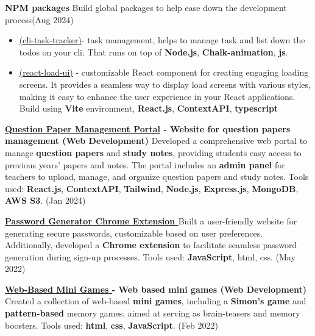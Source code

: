 \documentclass[a4paper,20pt]{article}
\newcommand{\resumeItem}[2]{
  \item\small{
    \textbf{#1}{ #2 \vspace{-2pt}}
  }
}
\newcommand{\resumeSubItem}[2]{\resumeItem{#1}{#2}\vspace{-3pt}}
\newcommand{\resumeItemListStart}{\begin{itemize}}
\newcommand{\resumeItemListEnd}{\end{itemize}\vspace{-5pt}}
\begin{document}
\resumeItem{NPM packages}{Build global packages to help ease down the development process(Aug 2024)}
	\resumeItemListStart
        \resumeItem{}{\href{https://www.npmjs.com/package/cli-task-tracker}{(cli-task-tracker)}- task management, helps to manage task and list down the todos on your cli. That runs on top of \textbf{Node.js}, \textbf{Chalk-animation}, \textbf{js}. }
        \resumeItem{}{\href{https://www.npmjs.com/package/react-loadscreen-ui}{(react-load-ui)} - customizable React component for creating engaging loading screens. It provides a seamless way to display load screens with various styles, making it easy to enhance the user experience in your React applications. Build using \textbf{Vite} environment, \textbf{React.js}, \textbf{ContextAPI}, \textbf{typescript}}
	\resumeItemListEnd
\vspace{5pt}
\resumeSubItem{\href{https://github.com/DaaSH23/QPportal}{Question Paper Management Portal} - Website for question papers management (Web Development)}{Developed a comprehensive web portal to manage \textbf{question papers} and \textbf{study notes}, providing students easy access to previous years' papers and notes. The portal includes an \textbf{admin panel} for teachers to upload, manage, and organize question papers and study notes. Tools used: \textbf{React.js}, \textbf{ContextAPI}, \textbf{Tailwind}, \textbf{Node.js}, \textbf{Express.js}, \textbf{MongoDB}, \textbf{AWS S3}. (Jan 2024)}
\vspace{5pt}
\resumeSubItem{\href{https://github.com/DaaSH23/Password-gen-extension}{Password Generator Chrome Extension }}{Built a user-friendly website for generating secure passwords, customizable based on user preferences. Additionally, developed a \textbf{Chrome extension} to facilitate seamless password generation during sign-up processes. Tools used: \textbf{JavaScript}, html, css. (May 2022)}
\vspace{5pt}
\resumeSubItem{\href{https://github.com/DaaSH23/mini-game-abhishekO}{ Web-Based Mini Games }- Web based mini games (Web Development)}{Created a collection of web-based \textbf{mini games}, including a \textbf{Simon's game} and \textbf{pattern-based} memory games, aimed at serving as brain-teasers and memory boosters. Tools used: \textbf{html}, \textbf{css}, \textbf{JavaScript}. (Feb 2022)}
\end{document}
